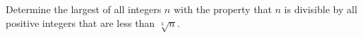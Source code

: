 Determine the largest of all integers $n$ with the property that $n$ is divisible by all positive integers that are less than $\sqrt[3]{n}$.